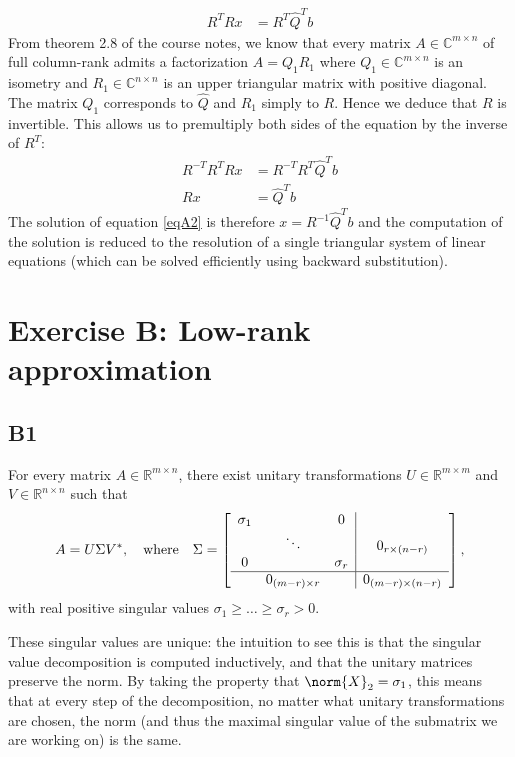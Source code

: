 \documentclass[11pt]{article}
\newcommand{\real}{\mathbb{R}} %
\newcommand{\complex}{\mathbb{C}} %
\newcommand{\snorm}[1]{\norm{#1}_2} %
\begin{document}
\begin{align*}
    R^TRx &= R^T\hat{Q}^Tb
\end{align*}
From theorem 2.8 of the course notes, we know that every matrix $A\in\complex^{m\times n}$ of full column-rank admits a factorization $A=Q_1R_1$ where $Q_1\in\complex^{m\times n}$ is an isometry and $R_1\in\complex^{n\times n}$ is an upper triangular matrix with positive diagonal. The matrix $Q_1$ corresponds to $\hat{Q}$ and $R_1$ simply to $R$. Hence we deduce that $R$ is invertible. This allows us to premultiply both sides of the equation by the inverse of $R^T$:
\begin{align*}
    R^{-T}R^TRx &= R^{-T}R^T\hat{Q}^Tb\\
    Rx &= \hat{Q}^Tb
\end{align*}
The solution of equation \eqref{eqA2} is therefore $x=R^{-1}\hat{Q}^Tb$ and the computation of the solution is reduced to the resolution of a single triangular system of linear equations (which can be solved efficiently using backward substitution).


\section*{Exercise B: Low-rank approximation}
\subsection*{B1}
For every matrix \(A \in \real^{m \times n}\), there exist unitary transformations \(U \in \real^{m \times m}\) and \(V \in \real^{n \times n}\) such that
\[
A = U \Sigma V^*, \quad \textnormal{where}\quad \Sigma = \left[\begin{array}{ccc|c}
\sigma_1 & & 0 & \\
& \ddots & & 0_{r \times (n-r)}\\
0 && \sigma_r & \\
\hline
& 0_{(m-r) \times r} & & 0_{(m-r) \times (n-r)}
\end{array}\right],
\]
with real positive singular values \(\sigma_1 \geqslant \dots \geqslant \sigma_r > 0\).

These singular values are unique: the intuition to see this is that the singular value decomposition is computed inductively, and that the unitary matrices preserve the norm.
By taking the property that \(\snorm{X} = \sigma_1\), this means that at every step of the decomposition, no matter what unitary transformations are chosen, the norm (and thus the maximal singular value of the submatrix we are working on) is the same.
\end{document}
